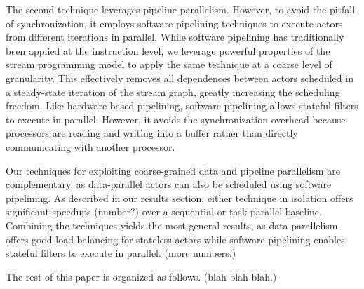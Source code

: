 The second technique leverages pipeline parallelism.  However, to
avoid the pitfall of synchronization, it employs software pipelining
techniques to execute actors from different iterations in parallel.
While software pipelining has traditionally been applied at the
instruction level, we leverage powerful properties of the stream
programming model to apply the same technique at a coarse level of
granularity.  This effectively removes all dependences between actors
scheduled in a steady-state iteration of the stream graph, greatly
increasing the scheduling freedom.  Like hardware-based pipelining,
software pipelining allows stateful filters to execute in parallel.
However, it avoids the synchronization overhead because processors are
reading and writing into a buffer rather than directly communicating
with another processor.

Our techniques for exploiting coarse-grained data and pipeline
parallelism are complementary, as data-parallel actors can also be
scheduled using software pipelining.  As described in our results
section, either technique in isolation offers significant speedups
(number?) over a sequential or task-parallel baseline.  Combining the
techniques yields the most general results, as data parallelism offers
good load balancing for stateless actors while software pipelining
enables stateful filters to execute in parallel.  (more numbers.)

The rest of this paper is organized as follows.  (blah blah blah.)

